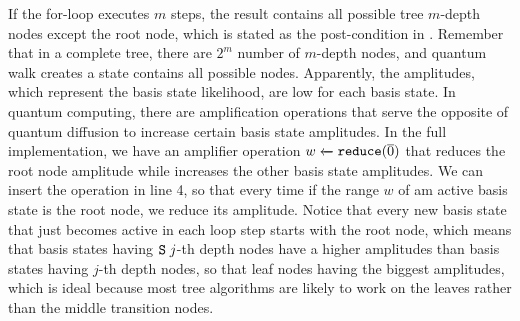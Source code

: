 If the for-loop executes $m$ steps, the result contains all possible tree $m$-depth nodes except the root node, which is stated as the post-condition in . Remember that in a complete tree, there are $2^m$ number of $m$-depth nodes, and quantum walk creates a state contains all possible nodes. Apparently, the amplitudes, which represent the basis state likelihood, are low for each basis state. In quantum computing, there are amplification operations that serve the opposite of quantum diffusion to increase certain basis state amplitudes. In the full \qafny implementation, we have an amplifier operation ${w} \xleftarrow{} {\texttt{reduce}(\overline{0})}$ that reduces the root node amplitude while increases the other basis state amplitudes. We can insert the operation in  line 4, so that every time if the range $w$ of am active basis state is the root node, we reduce its amplitude. Notice that every new basis state that just becomes active in each loop step starts with the root node, which means that basis states having $\texttt{S}\;j$-th depth nodes have a higher amplitudes than basis states having $j$-th depth nodes, so that leaf nodes having the biggest amplitudes, which is ideal because most tree algorithms are likely to work on the leaves rather than the middle transition nodes. 













